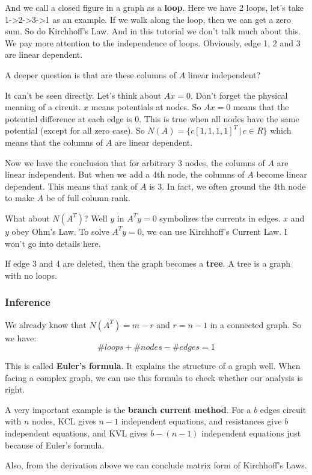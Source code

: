 \documentclass[12pt]{ctexart}
\begin{document}
And we call a closed figure in a graph as a \textbf{loop}. Here we have 2 loops, let's
take 1->2->3->1 as an example. If we walk along the loop, then we can get a zero sum.
So do Kirchhoff's Law. And in this tutorial we don't talk much about this. We pay more
attention to the independence of loops. Obviously, edge 1, 2 and 3 are linear dependent.

A deeper question is that are these columns of $A$ linear independent?

It can't be seen directly. Let's think about $Ax = 0$. Don't forget the physical meaning of
a circuit. $x$ means potentials at nodes. So $Ax = 0$ means that the potential
difference at each edge is 0. This is true when all nodes have the same potential (except for
all zero case). So $N(A) = \{c[1, 1, 1, 1]^T \,|\, c \in R\}$ which means that the columns of
$A$ are linear dependent.

Now we have the conclusion that for arbitrary 3 nodes, the columns of $A$ are linear
independent. But when we add a 4th node, the columns of $A$ become linear dependent.
This means that rank of $A$ is 3. In fact, we often ground the 4th node to make $A$ be of
full column rank.

What about $N(A^{T})$? Well $y$ in $A^{T}y = 0$ symbolizes the currents in edges. $x$ and
$y$ obey Ohm's Law. To solve $A^{T}y = 0$, we can use Kirchhoff's Current Law. I won't
go into details here.

If edge 3 and 4 are deleted, then the graph becomes a \textbf{tree}. A tree is a graph
with no loops.

\subsubsection{\textbf{Inference}}

We already know that $N(A^{T}) = m - r$ and $r = n - 1$ in a connected graph. So we have:
\[
  \# loops + \# nodes - \# edges = 1
\]

This is called \textbf{Euler's formula}. It explains the structure of a graph well. When
facing a complex graph, we can use this formula to check whether our analysis is right.

A very important example is the \textbf{branch current method}. For a $b$ edges circuit with
$n$ nodes, KCL gives $n - 1$ independent equations, and resistances give $b$ independent
equations, and KVL gives $b - (n - 1)$ independent equations just because of Euler's formula.

Also, from the derivation above we can conclude matrix form of Kirchhoff's Laws.
\end{document}
